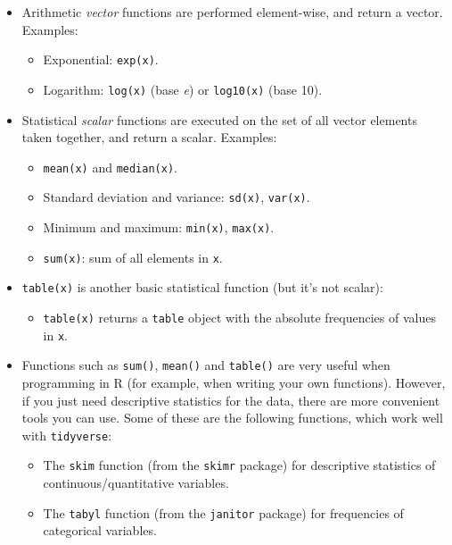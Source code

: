 \documentclass[
]{book}
\providecommand{\tightlist}{%
  \setlength{\itemsep}{0pt}\setlength{\parskip}{0pt}}
\begin{document}
\begin{itemize}
\tightlist
\item
  Arithmetic \emph{vector} functions are performed element-wise, and return a vector. Examples:

  \begin{itemize}
  \tightlist
  \item
    Exponential: \texttt{exp(x)}.
  \item
    Logarithm: \texttt{log(x)} (base \emph{e}) or \texttt{log10(x)} (base 10).
  \end{itemize}
\item
  Statistical \emph{scalar} functions are executed on the set of all vector elements taken together, and return a scalar. Examples:

  \begin{itemize}
  \tightlist
  \item
    \texttt{mean(x)} and \texttt{median(x)}.
  \item
    Standard deviation and variance: \texttt{sd(x)}, \texttt{var(x)}.
  \item
    Minimum and maximum: \texttt{min(x)}, \texttt{max(x)}.
  \item
    \texttt{sum(x)}: sum of all elements in \texttt{x}.
  \end{itemize}
\item
  \texttt{table(x)} is another basic statistical function (but it's not scalar):

  \begin{itemize}
  \tightlist
  \item
    \texttt{table(x)} returns a \texttt{table} object with the absolute frequencies of values in \texttt{x}.
  \end{itemize}
\item
  Functions such as \texttt{sum()}, \texttt{mean()} and \texttt{table()} are very useful when programming in R (for example, when writing your own functions). However, if you just need descriptive statistics for the data, there are more convenient tools you can use. Some of these are the following functions, which work well with \texttt{tidyverse}:

  \begin{itemize}
  \tightlist
  \item
    The \texttt{skim} function (from the \texttt{skimr} package) for descriptive statistics of continuous/quantitative variables.
  \item
    The \texttt{tabyl} function (from the \texttt{janitor} package) for frequencies of categorical variables.
  \end{itemize}
\end{itemize}
\end{document}
